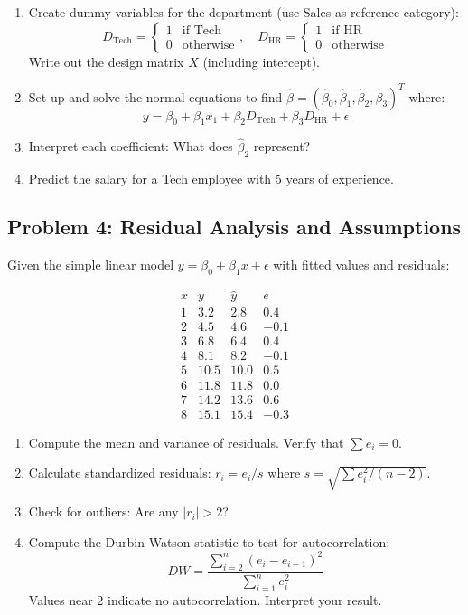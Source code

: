 \documentclass[12pt]{article}
\begin{document}
\begin{enumerate}[label=(\alph*)]
\item Create dummy variables for the department (use Sales as reference category):
\[
D_{\text{Tech}} = \begin{cases} 1 & \text{if Tech} \\ 0 & \text{otherwise} \end{cases}, \quad
D_{\text{HR}} = \begin{cases} 1 & \text{if HR} \\ 0 & \text{otherwise} \end{cases}
\]
Write out the design matrix \(X\) (including intercept).

\item Set up and solve the normal equations to find \(\hat{\beta} = (\hat{\beta}_0, \hat{\beta}_1, \hat{\beta}_2, \hat{\beta}_3)^T\) where:
\[
y = \beta_0 + \beta_1 x_1 + \beta_2 D_{\text{Tech}} + \beta_3 D_{\text{HR}} + \epsilon
\]

\item Interpret each coefficient: What does \(\hat{\beta}_2\) represent?

\item Predict the salary for a Tech employee with 5 years of experience.
\end{enumerate}

\subsection*{Problem 4: Residual Analysis and Assumptions}

Given the simple linear model \(y = \beta_0 + \beta_1 x + \epsilon\) with fitted values and residuals:

\[
\begin{array}{c|c|c|c}
x & y & \hat{y} & e \\
\hline
1 & 3.2 & 2.8 & 0.4 \\
2 & 4.5 & 4.6 & -0.1 \\
3 & 6.8 & 6.4 & 0.4 \\
4 & 8.1 & 8.2 & -0.1 \\
5 & 10.5 & 10.0 & 0.5 \\
6 & 11.8 & 11.8 & 0.0 \\
7 & 14.2 & 13.6 & 0.6 \\
8 & 15.1 & 15.4 & -0.3
\end{array}
\]

\begin{enumerate}[label=(\alph*)]
\item Compute the mean and variance of residuals. Verify that \(\sum e_i = 0\).

\item Calculate standardized residuals: \(r_i = e_i / s\) where \(s = \sqrt{\sum e_i^2/(n-2)}\).

\item Check for outliers: Are any \(|r_i| > 2\)?

\item Compute the Durbin-Watson statistic to test for autocorrelation:
\[
DW = \frac{\sum_{i=2}^{n}(e_i - e_{i-1})^2}{\sum_{i=1}^{n}e_i^2}
\]
Values near 2 indicate no autocorrelation. Interpret your result.
\end{enumerate}
\end{document}
